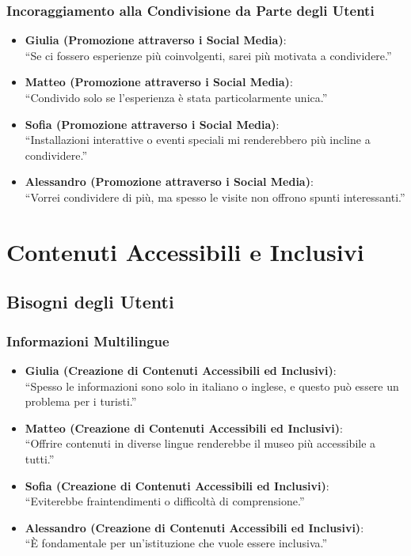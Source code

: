 \documentclass{article}
\begin{document}
\subsubsection{Incoraggiamento alla Condivisione da Parte degli Utenti}

\begin{itemize}
    \item \textbf{Giulia (Promozione attraverso i Social Media)}:\\
    ``Se ci fossero esperienze più coinvolgenti, sarei più motivata a condividere.''
    \item \textbf{Matteo (Promozione attraverso i Social Media)}:\\
    ``Condivido solo se l'esperienza è stata particolarmente unica.''
    \item \textbf{Sofia (Promozione attraverso i Social Media)}:\\
    ``Installazioni interattive o eventi speciali mi renderebbero più incline a condividere.''
    \item \textbf{Alessandro (Promozione attraverso i Social Media)}:\\
    ``Vorrei condividere di più, ma spesso le visite non offrono spunti interessanti.''
\end{itemize}

\section{Contenuti Accessibili e Inclusivi}

\subsection{Bisogni degli Utenti}

\subsubsection{Informazioni Multilingue}

\begin{itemize}
    \item \textbf{Giulia (Creazione di Contenuti Accessibili ed Inclusivi)}:\\
    ``Spesso le informazioni sono solo in italiano o inglese, e questo può essere un problema per i turisti.''
    \item \textbf{Matteo (Creazione di Contenuti Accessibili ed Inclusivi)}:\\
    ``Offrire contenuti in diverse lingue renderebbe il museo più accessibile a tutti.''
    \item \textbf{Sofia (Creazione di Contenuti Accessibili ed Inclusivi)}:\\
    ``Eviterebbe fraintendimenti o difficoltà di comprensione.''
    \item \textbf{Alessandro (Creazione di Contenuti Accessibili ed Inclusivi)}:\\
    ``È fondamentale per un'istituzione che vuole essere inclusiva.''
\end{itemize}
\end{document}
